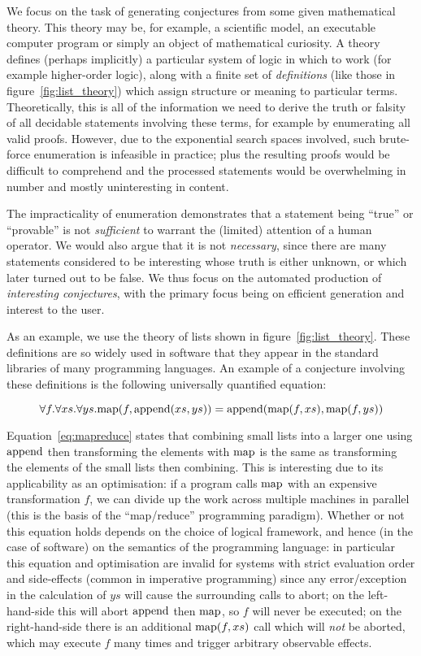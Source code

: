 We focus on the task of generating conjectures from some given mathematical
theory. This theory may be, for example, a scientific model, an executable
computer program or simply an object of mathematical curiosity. A theory
defines (perhaps implicitly) a particular system of logic in which to work (for
example higher-order logic), along with a finite set of \emph{definitions} (like
those in figure~\ref{fig:list_theory}) which assign structure or meaning to
particular terms. Theoretically, this is all of the information we need to
derive the truth or falsity of all decidable statements involving these terms,
for example by enumerating all valid proofs. However, due to the exponential
search spaces involved, such brute-force enumeration is infeasible in practice;
plus the resulting proofs would be difficult to comprehend and the processed
statements would be overwhelming in number and mostly uninteresting in content.

The impracticality of enumeration demonstrates that a statement being ``true''
or ``provable'' is not \emph{sufficient} to warrant the (limited) attention of a
human operator. We would also argue that it is not \emph{necessary}, since there
are many statements considered to be interesting whose truth is either unknown,
or which later turned out to be false. We thus focus on the automated production
of \emph{interesting conjectures}, with the primary focus being on efficient
generation and interest to the user.

As an example, we use the theory of lists shown in
figure~\ref{fig:list_theory}. These definitions are so widely used in
software that they appear in the standard libraries of many programming
languages. An example of a conjecture involving these definitions is the
following universally quantified equation:

\begin{equation} \label{eq:mapreduce}
  \forall f. \forall xs. \forall ys.
    \text{map}(f, \text{append}(xs, ys)) = \text{append}(\text{map}(f, xs), \text{map}(f, ys))
\end{equation}

Equation~\ref{eq:mapreduce} states that combining small lists into a larger one
using $\text{append}$ then transforming the elements with $\text{map}$ is the same as
transforming the elements of the small lists then combining. This is interesting
due to its applicability as an optimisation: if a program calls $\text{map}$ with an
expensive transformation $f$, we can divide up the work across multiple machines
in parallel (this is the basis of the ``map/reduce'' programming paradigm).
Whether or not this equation holds depends on the choice of logical framework,
and hence (in the case of software) on the semantics of the programming
language: in particular this equation and optimisation are invalid for systems
with strict evaluation order and side-effects (common in imperative programming)
since any error/exception in the calculation of $ys$ will cause the surrounding
calls to abort; on the left-hand-side this will abort $\text{append}$ then $\text{map}$, so
$f$ will never be executed; on the right-hand-side there is an additional
$\text{map}(f, xs)$ call which will \emph{not} be aborted, which may execute $f$ many
times and trigger arbitrary observable effects.
